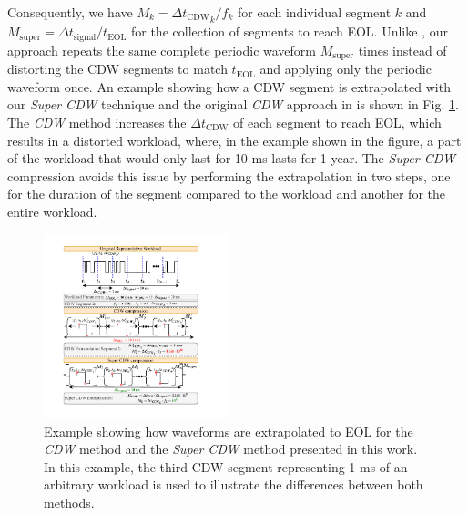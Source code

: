 Consequently, we have $M_k = \Delta {t_{\text{CDW}}}_k / f_k$ for each individual segment $k$ and $M_{\text{super}} = \Delta t_\text{signal} /  t_\text{EOL}$ for the collection of segments to reach EOL. Unlike \cite{AtomisticPseudoRodopoulos2014}, our approach repeats the same complete periodic waveform $M_{\text{super}}$ times instead of distorting the CDW segments to match $ t_\text{EOL}$ and applying only the periodic waveform once. An example showing how a CDW segment is extrapolated with our \textit{Super CDW} technique and the original \textit{CDW} approach in \cite{AtomisticPseudoRodopoulos2014} is shown in Fig. \ref{fig:CDWvsSuperCDW}. The \textit{CDW} method increases the $\Delta t_{\text{CDW}}$ of each segment to reach EOL, which results in a distorted workload, where, in the example shown in the figure, a part of the workload that would only last for 10 ms lasts for 1 year. The \textit{Super CDW} compression avoids this issue by performing the extrapolation in two steps, one for the duration of the segment compared to the workload and another for the entire workload. 

\begin{figure}[!t]
    \includegraphics[width=0.48\textwidth,trim={11mm 8mm 18.5mm 5mm},clip]{images/ch2/CDWvsSuperCDW.pdf}
    \caption{Example showing how waveforms are extrapolated to EOL for the \textit{CDW} method \cite{AtomisticPseudoRodopoulos2014} and the \textit{Super CDW} method presented in this work. In this example, the third CDW segment representing 1 ms of an arbitrary workload is used to illustrate the differences between both methods. }
    \label{fig:CDWvsSuperCDW}
\end{figure}

